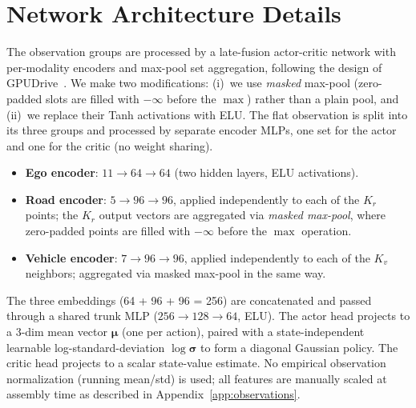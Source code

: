 \section{Network Architecture Details}
\label{app:network}

The observation groups are processed by a late-fusion actor-critic network with per-modality encoders and max-pool set aggregation, following the design of GPUDrive~\cite{kazemkhani_gpudrive_2025}.
We make two modifications: (i)~we use \emph{masked} max-pool (zero-padded slots are filled with $-\infty$ before the $\max$) rather than a plain pool, and (ii)~we replace their Tanh activations with ELU.
The flat observation is split into its three groups and processed by separate encoder MLPs, one set for the actor and one for the critic (no weight sharing).

\begin{itemize}[leftmargin=*, itemsep=1pt]
  \item \textbf{Ego encoder}: $11 \to 64 \to 64$ (two hidden layers, ELU activations).
  \item \textbf{Road encoder}: $5 \to 96 \to 96$, applied independently to each of the $K_r$ points; the $K_r$ output vectors are aggregated via \emph{masked max-pool}, where zero-padded points are filled with $-\infty$ before the $\max$ operation.
  \item \textbf{Vehicle encoder}: $7 \to 96 \to 96$, applied independently to each of the $K_v$ neighbors; aggregated via masked max-pool in the same way.
\end{itemize}

The three embeddings (64 + 96 + 96 = 256) are concatenated and passed through a shared trunk MLP ($256 \to 128 \to 64$, ELU).
The actor head projects to a 3-dim mean vector $\boldsymbol{\mu}$ (one per action), paired with a state-independent learnable log-standard-deviation $\log\boldsymbol{\sigma}$ to form a diagonal Gaussian policy.
The critic head projects to a scalar state-value estimate.
No empirical observation normalization (running mean/std) is used; all features are manually scaled at assembly time as described in Appendix~\ref{app:observations}.



